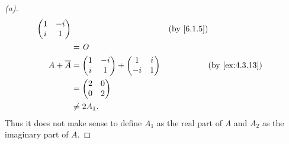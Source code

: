 \begin{proof}[(a)]
\begin{align*}
{\begin{pmatrix}
                                                         1 & -i \\
                                                         i & 1
                                                       \end{pmatrix}} &  & \by{6.1.5} \\
                 & = \zm                                                            \\
    A + \conj{A} & = \begin{pmatrix}
                       1 & -i \\
                       i & 1
                     \end{pmatrix} + \begin{pmatrix}
                                       1  & i \\
                                       -i & 1
                                     \end{pmatrix}   &  & \by{ex:4.3.13}            \\
                 & = \begin{pmatrix}
                       2 & 0 \\
                       0 & 2
                     \end{pmatrix}                                                 \\
                 & \neq 2 A_1.
  \end{align*}
  Thus it does not make sense to define \(A_1\) as the real part of \(A\) and \(A_2\) as the imaginary part of \(A\).
\end{proof}

